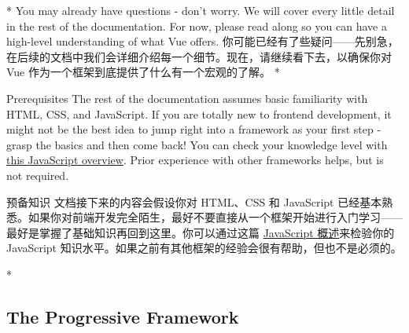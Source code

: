 \begin{paracol}{2}
\switchcolumn[0]*%
You may already have questions - don't worry. We will cover every little
detail in the rest of the documentation. For now, please read along so
you can have a high-level understanding of what Vue offers.
\switchcolumn
你可能已经有了些疑问------先别急，在后续的文档中我们会详细介绍每一个细节。现在，请继续看下去，以确保你对
Vue 作为一个框架到底提供了什么有一个宏观的了解。
\switchcolumn[0]*%
\begin{vueQuote}
{Prerequisites}
The rest of the documentation assumes basic familiarity with HTML, CSS,
and JavaScript. If you are totally new to frontend development, it might
not be the best idea to jump right into a framework as your first step -
grasp the basics and then come back! You can check your knowledge level
with
\href{https://developer.mozilla.org/en-US/docs/Web/JavaScript/A_re-introduction_to_JavaScript}{this
JavaScript overview}. Prior experience with other frameworks helps, but
is not required.
\end{vueQuote}
\switchcolumn

\begin{vueQuote}{预备知识}
文档接下来的内容会假设你对 HTML、CSS 和 JavaScript
已经基本熟悉。如果你对前端开发完全陌生，最好不要直接从一个框架开始进行入门学习------最好是掌握了基础知识再回到这里。你可以通过这篇
\href{https://developer.mozilla.org/zh-CN/docs/Web/JavaScript/A_re-introduction_to_JavaScript}{JavaScript
概述}来检验你的 JavaScript
知识水平。如果之前有其他框架的经验会很有帮助，但也不是必须的。
\end{vueQuote}
\switchcolumn[0]*%
\subsection{The Progressive Framework}
\switchcolumn

\end{paracol}

